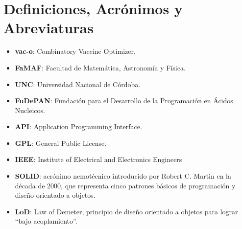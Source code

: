 \section{Definiciones, Acr\'onimos y Abreviaturas}
  \label{appendix-def}
  \begin{itemize}
    \item \textbf{vac-o}: Combinatory Vaccine Optimizer.
    \item \textbf{FaMAF}: Facultad de Matem\'atica, Astronom\'ia y F\'isica.
    \item \textbf{UNC}: Universidad Nacional de C\'ordoba.
    \item \textbf{FuDePAN}: Fundaci\'on para el Desarrollo de la Programaci\'on en \'Acidos Nucleicos.
    \item \textbf{API}: Application Programming Interface.
    \item \textbf{GPL}: General Public License.
    \item \textbf{IEEE}: Institute of Electrical and Electronics Engineers
    \item \textbf{SOLID}: acr\'onimo nemot\'ecnico introducido por Robert C. Martin en la d\'ecada de 2000, que representa cinco patrones b\'asicos de programaci\'on y dise\~no orientado a objetos.
    \item \textbf{LoD}: Law of Demeter, principio de dise\~no orientado a objetos para lograr ``bajo acoplamiento''.    
    \end{itemize}